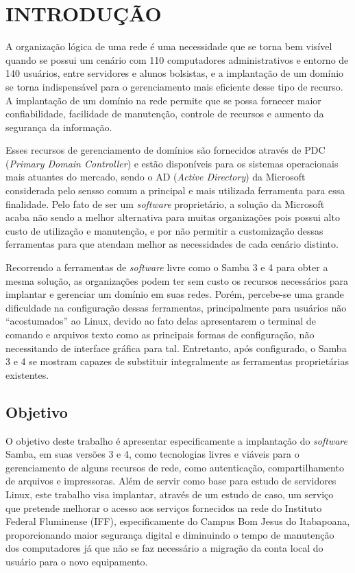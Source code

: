 \chapter{INTRODUÇÃO}

A organização lógica de uma rede é uma necessidade que se torna bem visível quando se possui um cenário com 110 computadores administrativos e entorno de 140 usuários, entre servidores e alunos bolsistas, e a implantação de um domínio se torna indispensável para o gerenciamento mais eficiente desse tipo de recurso. A implantação de um domínio na rede permite que se possa fornecer maior confiabilidade, facilidade de manutenção, controle de recursos e aumento da segurança da informação.

Esses recursos de gerenciamento de domínios são fornecidos através de PDC (\textit{Primary Domain Controller}) e estão disponíveis para os sistemas operacionais mais atuantes do mercado, sendo o AD (\textit{Active Directory}) da Microsoft considerada pelo sensso comum a principal e mais utilizada ferramenta para essa finalidade. Pelo fato de ser um \textit{software} proprietário, a solução da Microsoft acaba não sendo a melhor alternativa para muitas organizações pois possui alto custo de utilização e manutenção, e por não permitir a customização dessas ferramentas para que atendam melhor as necessidades de cada cenário distinto.

Recorrendo a ferramentas de \textit{software} livre como o Samba 3 e 4 para obter a mesma solução, as organizações podem ter sem custo os recursos necessários para implantar e gerenciar um domínio em suas redes. Porém, percebe-se uma grande dificuldade na configuração dessas ferramentas, principalmente para usuários não “acostumados” ao Linux, devido ao fato delas apresentarem o terminal de comando e arquivos texto como as principais formas de configuração, não necessitando de interface gráfica para tal. Entretanto, após configurado, o Samba 3 e 4 se mostram capazes de substituir integralmente as ferramentas proprietárias existentes.

\section{Objetivo}

O objetivo deste trabalho é apresentar especificamente a implantação do \textit{software} Samba, em suas versões 3 e 4, como tecnologias livres e viáveis para o gerenciamento de alguns recursos de rede, como autenticação, compartilhamento de arquivos e impressoras. Além de servir como base para estudo de servidores Linux, este trabalho visa implantar, através de um estudo de caso, um serviço que pretende melhorar o acesso aos serviços fornecidos na rede do Instituto Federal Fluminense (IFF), especificamente do Campus Bom Jesus do Itabapoana, proporcionando maior segurança digital e diminuindo o tempo de manutenção dos computadores já que não se faz necessário a migração da conta local do usuário para o novo equipamento.


